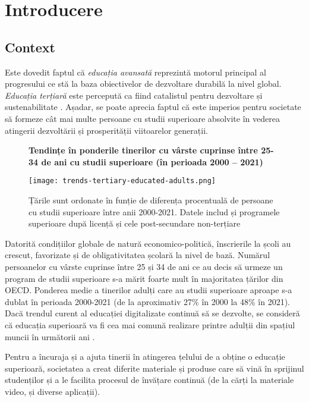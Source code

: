 \chapter{Introducere}

\section{Context}

Este dovedit faptul că \textit{educația avansată} reprezintă motorul principal al progresului ce stă la baza obiectivelor de dezvoltare durabilă la nivel global. \textit{Educația terțiară} este percepută ca fiind catalistul pentru dezvoltare și sustenabilitate \cite{educationParticipantsOECD}. Așadar, se poate aprecia faptul că este imperios pentru societate să formeze cât mai multe persoane cu studii superioare absolvite în vederea atingerii dezvoltării și prosperității viitoarelor generații.

\begin{figure}[H]
    \centering
    \textbf{Tendințe în ponderile tinerilor cu vârste cuprinse între 25-34 de ani cu studii superioare (în perioada 2000 – 2021)}\par\medskip
    \texttt{[image: trends-tertiary-educated-adults.png]}
    \caption{Țările sunt ordonate în funție de diferența procentuală de persoane cu studii superioare între anii 2000-2021. Datele includ și programele superioare după licență și cele post-secundare non-terțiare \cite{levelAdultsStudiedOECD}}
\end{figure}

Datorită condițiilor globale de natură economico-politică, înscrierile la școli au crescut, favorizate și de obligativitatea școlară la nivel de bază. Numărul persoanelor cu vârste cuprinse între 25 și 34 de ani ce au decis să urmeze un program de studii superioare s-a mărit foarte mult în majoritatea țărilor din OECD. Ponderea medie a tinerilor adulți care au studii superioare aproape s-a dublat în perioada 2000-2021 (de la aproximativ 27\% în 2000 la 48\% în 2021). Dacă trendul curent al educației digitalizate continuă să se dezvolte, se consideră că educația superioară va fi cea mai comună realizare printre adulții din spațiul muncii în următorii ani \cite{levelAdultsStudiedOECD}.

Pentru a încuraja și a ajuta tinerii în atingerea țelului de a obține o educație superioară, societatea a creat diferite materiale și produse care să vină în sprijinul studenților și a le facilita procesul de învățare continuă (de la cărți la materiale video, și diverse aplicații).


